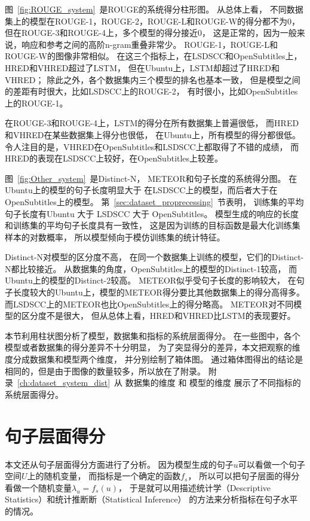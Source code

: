 
图~\ref{fig:ROUGE_system}~是ROUGE的系统得分柱形图。
从总体上看，
不同数据集上的模型在ROUGE-1，ROUGE-2，ROUGE-L和ROUGE-W的得分都不为0，
但在ROUGE-3和ROUGE-4上，多个模型的得分接近0，
这是正常的，因为一般来说，响应和参考之间的高阶n-gram重叠非常少。
ROUGE-1，ROUGE-L和ROUGE-W的图像非常相似。
在这三个指标上，在LSDSCC和OpenSubtitles上，HRED和VHRED超过了LSTM，
但在Ubuntu上，LSTM却超过了HRED和VHRED；
除此之外，各个数据集内三个模型的排名也基本一致，
但是模型之间的差距有时很大，比如LSDSCC上的ROUGE-2，
有时很小，比如OpenSubtitles上的ROUGE-1。

在ROUGE-3和ROUGE-4上，LSTM的得分在所有数据集上普遍很低，
而HRED和VHRED在某些数据集上得分也很低，
在Ubuntu上，所有模型的得分都很低。
令人注目的是，VHRED在OpenSubtitles和LSDSCC上都取得了不错的成绩，
而HRED的表现在LSDSCC上较好，在OpenSubtitles上较差。

图~\ref{fig:Other_system}~是Distinct-N，
METEOR和句子长度的系统得分图。
在Ubuntu上的模型的句子长度明显大于
在LSDSCC上的模型，而后者大于在OpenSubtitles上的模型。
第~\ref{sec:dataset_proprecessing}~节表明，
训练集的平均句子长度有Ubuntu 大于 LSDSCC 大于 OpenSubtitles。
模型生成的响应的长度和训练集的平均句子长度具有一致性，
这是因为训练的目标函数是最大化训练集样本的对数概率，
所以模型倾向于模仿训练集的统计特征。

Distinct-N对模型的区分度不高，
在同一个数据集上训练的模型，它们的Distinct-N都比较接近。
从数据集的角度，OpenSubtitles上的模型的Distinct-1较高，
而Ubuntu上的模型的Distinct-2较高。
METEOR似乎受句子长度的影响较大，
在句子长度较大的Ubuntu上，模型的METEOR得分要比其他数据集上的得分高得多。
而LSDSCC上的METEOR也比OpenSubtitles上的得分略高。
METEOR对不同模型的区分度不是很大，
但从总体上看，HRED和VHRED比LSTM的表现要好。


本节利用柱状图分析了模型，数据集和指标的系统层面得分。
在一些图中，各个模型或者数据集的得分差异不十分明显，
为了突显得分的差异，本文把观察的维度分成数据集和模型两个维度，
并分别绘制了箱体图。
通过箱体图得出的结论是相同的，但是由于图像的数量较多，所以放在了附录。
附录~\ref{ch:dataset_system_dist}~从
数据集的维度 和 模型的维度 展示了不同指标的系统层面得分。

\section{句子层面得分}\label{sec:utterance_scores}
本文还从句子层面得分方面进行了分析。
因为模型生成的句子$u$可以看做一个句子空间$U$上的随机变量，
而指标是一个确定的函数$f_{s}$，
所以可以把句子层面的得分看做一个随机变量$\lambda_u = f_{s}(u)$，
于是就可以用描述统计学（Descriptive Statistics）和统计推断断（Statistical Inference）
的方法来分析指标在句子水平的情况。

